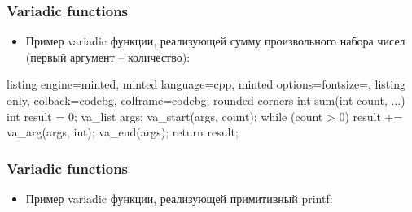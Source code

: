 \documentclass[10pt]{beamer}
\begin{document}
\begin{frame}[fragile]
\frametitle{Variadic functions}
\begin{itemize}
\item Пример variadic функции, реализующей сумму произвольного набора чисел (первый аргумент -- количество):
\end{itemize}
\begin{tcblisting}{listing engine=minted, minted language=cpp, minted options={fontsize=\scriptsize}, listing only, colback=codebg, colframe=codebg, rounded corners}
int sum(int count, ...) {
  int result = 0;
  va_list args;
  va_start(args, count);
  while (count > 0) {
    result += va_arg(args, int);
  }
  va_end(args);
  return result;
}
\end{tcblisting}
\end{frame}

\begin{frame}[fragile]
\frametitle{Variadic functions}
\begin{itemize}
\item Пример variadic функции, реализующей примитивный printf:
\end{itemize}
\end{frame}
\end{document}
